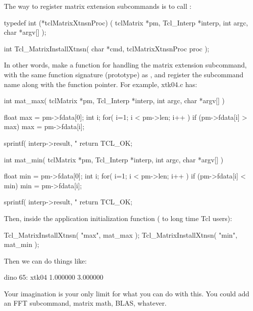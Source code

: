The way to register matrix extension subcommands is to call
: 
\begin{example}
typedef int (*tclMatrixXtnsnProc) ( tclMatrix *pm, Tcl_Interp *interp,
                                    int argc, char *argv[] );

int Tcl_MatrixInstallXtnsn( char *cmd, tclMatrixXtnsnProc proc );
\end{example}
In other words, make a function for handling the matrix extension
subcommand, with the same function signature (prototype) as
, and register the subcommand name along with
the function pointer.  For example, xtk04.c has:
\begin{example}
int mat_max( tclMatrix *pm, Tcl_Interp *interp,
             int argc, char *argv[] )
{
    float max = pm->fdata[0];
    int i;
    for( i=1; i < pm->len; i++ )
        if (pm->fdata[i] > max)
            max = pm->fdata[i];

    sprintf( interp->result, "%
    return TCL_OK;
}

int mat_min( tclMatrix *pm, Tcl_Interp *interp,
             int argc, char *argv[] )
{
    float min = pm->fdata[0];
    int i;
    for( i=1; i < pm->len; i++ )
        if (pm->fdata[i] < min)
            min = pm->fdata[i];

    sprintf( interp->result, "%
    return TCL_OK;
}
\end{example}
Then, inside the application initialization function
( to long time Tcl users):
\begin{example}
Tcl_MatrixInstallXtnsn( "max", mat_max );
Tcl_MatrixInstallXtnsn( "min", mat_min );
\end{example}
Then we can do things like:
\begin{example}
dino 65: xtk04
1.000000
3.000000
\end{example}

Your imagination is your only limit for what you can do with this.
You could add an FFT subcommand, matrix math, BLAS, whatever.  